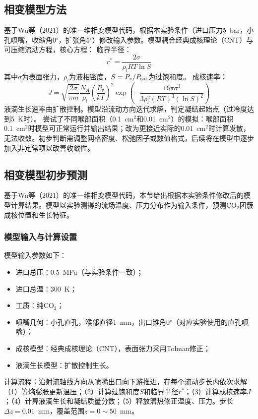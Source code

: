 	\subsection{相变模型方法}
	基于Wu等（2021）的准一维相变模型代码，根据本实验条件（进口压力5~bar，小孔喷嘴，收缩角0$^\circ$，扩张角5$^\circ$）修改输入参数。模型耦合经典成核理论（CNT）与可压缩流动方程，核心方程：
	临界半径：
	\begin{equation}
		r^*=\frac{2\sigma}{\rho_l RT\ln S}
		\label{eq:rcrit}
	\end{equation}
	其中$\sigma$为表面张力，$\rho_l$为液相密度，$S=P_v/P_{\rm sat}$为过饱和度。
	成核速率：
	\begin{equation}
		J=\sqrt{\frac{2\sigma}{\pi m}}\frac{N_A}{\rho_l}
		\left(\frac{P_v}{kT}\right)^2
		\exp\left(-\frac{16\pi\sigma^3}{3\rho_l^2(RT)^3(\ln S)^2}\right)
		\label{eq:nucl_rate}
	\end{equation}
	液滴生长速率由扩散控制。模型沿流动方向迭代求解，判定凝结起始点（过冷度达到5~K时）。
	尝试了不同喉部面积（0.1~cm$^2$和0.01~cm$^2$）的模拟：喉部面积0.1~cm$^2$时模型可正常运行并输出结果；改为更接近实际的0.01~cm$^2$时计算发散，无法收敛。初步判断需调整网格密度、松弛因子或数值格式，后续将在模型中逐步加入非定常项以改善收敛性。
	\subsection{相变模型初步预测}
	基于Wu等（2021）的准一维相变模型代码，本节给出根据本实验条件修改后的模型计算结果。模型以实验测得的流场温度、压力分布作为输入条件，预测CO$_2$团簇成核位置和生长特征。
	\subsubsection{模型输入与计算设置}
	模型输入参数如下：
	\begin{itemize}
		\item 进口总压：0.5~MPa（与实验条件一致）；
		\item 进口总温：300~K；
		\item 工质：纯CO$_2$；
		\item 喷嘴几何：小孔直孔，喉部直径1~mm，出口锥角0$^\circ$（对应实验使用的直孔喷嘴）；
		\item 成核模型：经典成核理论（CNT），表面张力采用Tolman修正；
		\item 液滴生长模型：扩散控制生长。
	\end{itemize}
	计算流程：沿射流轴线方向从喷嘴出口向下游推进，在每个流动步长内依次求解（1）等熵膨胀更新温压；（2）计算过饱和度$S$和临界半径$r^*$；（3）计算成核速率$J$；（4）计算液滴生长和凝结质量分数；（5）释放潜热修正温度、压力。步长$\Delta z = 0.01$~mm，覆盖范围$z=0\sim50$~mm。
